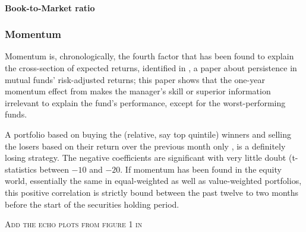 \paragraph{Book-to-Market ratio}


\subsubsection{Momentum}
Momentum is, chronologically, the fourth factor that has been found to explain the cross-section of expected returns, identified in \cite{Carhart1997}, a paper about persistence in mutual funds' risk-adjusted returns; this paper shows that the one-year momentum effect from \cite{Jegadeesh1993} makes the manager's skill or superior information irrelevant to explain the fund's performance, except for the worst-performing funds.

A portfolio based on buying the (relative, say top quintile) winners and selling the losers based on their return over the previous month only \parencite{Novy-Marx2012}, is a definitely losing strategy. The negative coefficients are significant with very little doubt (t-statistics between $-10$ and $-20$. If momentum has been found in the equity world, essentially the same in equal-weighted as well as value-weighted portfolios, this positive correlation is strictly bound between the past twelve to two months before the start of the securities holding period.

\begin{center}
\textsc{Add the echo plots from figure 1 in \cite{Novy-Marx2012}}
\end{center}

